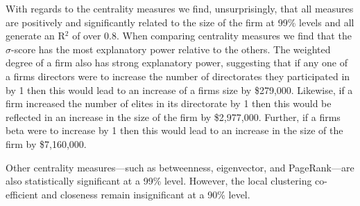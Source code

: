 With regards to the centrality measures we find, unsurprisingly, that all measures are positively and significantly related to the size of the firm at 99\% levels and all generate an R$^2$ of over 0.8. When comparing centrality measures we find that the $\sigma$-score has the most explanatory power relative to the others. The weighted degree of a firm also has strong explanatory power, suggesting that if any one of a firms directors were to increase the number of directorates they participated in by 1 then this would lead to an increase of a firms size by \$279,000. Likewise, if a firm increased the number of elites in its directorate by 1 then this would be reflected in an increase in the size of the firm by \$2,977,000. Further, if a firms beta were to increase by 1 then this would lead to an increase in the size of the firm by \$7,160,000.

Other centrality measures---such as betweenness, eigenvector, and PageRank---are also statistically significant at a 99\% level. However, the local clustering co-efficient and closeness remain insignificant at a 90\% level.

